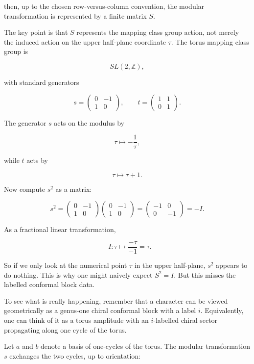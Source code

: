 \documentclass[
  10pt,
  a4paper,
  openany]{book}
\begin{document}
then, up to the chosen row-versus-column convention, the modular
transformation is represented by a finite matrix \(S\).

The key point is that \(S\) represents the mapping class group action,
not merely the induced action on the upper half-plane coordinate
\(\tau\). The torus mapping class group is

\[
SL(2,\mathbb Z),
\]

with standard generators

\[
s=
\begin{pmatrix}
0 & -1 \\
1 & 0
\end{pmatrix},
\qquad
t=
\begin{pmatrix}
1 & 1 \\
0 & 1
\end{pmatrix}.
\]

The generator \(s\) acts on the modulus by

\[
\tau \mapsto -\frac{1}{\tau},
\]

while \(t\) acts by

\[
\tau \mapsto \tau+1.
\]

Now compute \(s^2\) as a matrix:

\[
s^2
=
\begin{pmatrix}
0 & -1 \\
1 & 0
\end{pmatrix}
\begin{pmatrix}
0 & -1 \\
1 & 0
\end{pmatrix}
=
\begin{pmatrix}
-1 & 0 \\
0 & -1
\end{pmatrix}
=
-I.
\]

As a fractional linear transformation,

\[
-I:
\tau \mapsto
\frac{-\tau}{-1}
=
\tau.
\]

So if we only look at the numerical point \(\tau\) in the upper
half-plane, \(s^2\) appears to do nothing. This is why one might naively
expect \(S^2=I\). But this misses the labelled conformal block data.

To see what is really happening, remember that a character can be viewed
geometrically as a genus-one chiral conformal block with a label \(i\).
Equivalently, one can think of it as a torus amplitude with an
\(i\)-labelled chiral sector propagating along one cycle of the torus.

Let \(a\) and \(b\) denote a basis of one-cycles of the torus. The
modular transformation \(s\) exchanges the two cycles, up to
orientation:
\end{document}
